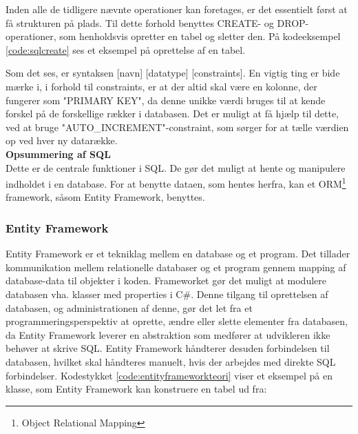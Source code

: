 

Inden alle de tidligere nævnte operationer kan foretages, er det essentielt først at få strukturen på plads. Til dette forhold benyttes CREATE- og DROP-operationer, som henholdsvis opretter en tabel og sletter den. På kodeeksempel \ref{code:sqlcreate} ses et eksempel på oprettelse af en tabel.


Som det ses, er syntaksen [navn] [datatype] [constraints]. En vigtig ting er bide mærke i, i forhold til constraints, er at der altid skal være en kolonne, der fungerer som "PRIMARY KEY", da denne unikke værdi bruges til at kende forskel på de forskellige rækker i databasen. Det er muligt at få hjælp til dette, ved at bruge "AUTO\_INCREMENT"\mbox{}-constraint, som sørger for at tælle værdien op ved hver ny datarække.\\

\textbf{Opsummering af SQL}\\
Dette er de centrale funktioner i SQL. De gør det muligt at hente og manipulere indholdet i en database. For at benytte dataen, som hentes herfra, kan et ORM\footnote{Object Relational Mapping} framework, såsom Entity Framework, benyttes.

\subsubsection{Entity Framework}
Entity Framework er et tekniklag mellem en database og et program. Det tillader kommunikation mellem relationelle databaser og et program gennem mapping af database-data til objekter i koden. Frameworket gør det muligt at modulere databasen vha. klasser med properties i C\#. Denne tilgang til oprettelsen af databasen, og administrationen af denne, gør det let fra et programmeringsperspektiv at oprette, ændre eller slette elementer fra databasen, da Entity Framework leverer en abstraktion som medfører at udvikleren ikke behøver at skrive SQL. Entity Framework håndterer desuden forbindelsen til databasen, hvilket skal håndteres manuelt, hvis der arbejdes med direkte SQL forbindelser. Kodestykket \ref{code:entityframeworkteori} viser et eksempel på en klasse, som Entity Framework kan konstruere en tabel ud fra:


